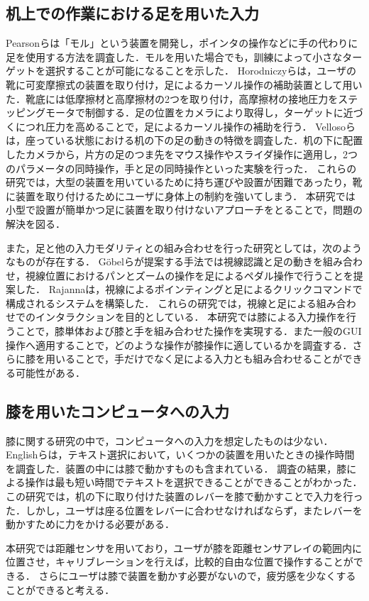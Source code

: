 \documentclass[submit, techrep]{ipsj}
\begin{document}
\subsection{机上での作業における足を用いた入力}
Pearsonら\cite{Pearson:1986:MMD:22627.22392, Pearson:1988:EEP:57167.57169}は「モル」という装置を開発し，ポインタの操作などに手の代わりに足を使用する方法を調査した．モルを用いた場合でも，訓練によって小さなターゲットを選択することが可能になることを示した．
Horodniczyら\cite{Horodniczy:2017:FHE:3025453.3025625}は，ユーザの靴に可変摩擦式の装置を取り付け，足によるカーソル操作の補助装置として用いた．靴底には低摩擦材と高摩擦材の2つを取り付け，高摩擦材の接地圧力をステッピングモータで制御する．足の位置をカメラにより取得し，ターゲットに近づくにつれ圧力を高めることで，足によるカーソル操作の補助を行う．
Vellosoら\cite{velloso:hal-01599657}は，座っている状態における机の下の足の動きの特徴を調査した．机の下に配置したカメラから，片方の足のつま先をマウス操作やスライダ操作に適用し，2つのパラメータの同時操作，手と足の同時操作といった実験を行った．
これらの研究では，大型の装置を用いているために持ち運びや設置が困難であったり，靴に装置を取り付けるためにユーザに身体上の制約を強いてしまう．
本研究では小型で設置が簡単かつ足に装置を取り付けないアプローチをとることで，問題の解決を図る．\par
また，足と他の入力モダリティとの組み合わせを行った研究としては，次のようなものが存在する．
G\"{o}belら\cite{Gobel:2013:GFI:2468356.2479610}が提案する手法では視線認識と足の動きを組み合わせ，視線位置におけるパンとズームの操作を足によるペダル操作で行うことを提案した．
Rajanna\cite{Rajanna:2016:GFI:2876456.2876462}は，視線によるポインティングと足によるクリックコマンドで構成されるシステムを構築した．
これらの研究では，視線と足による組み合わせでのインタラクションを目的としている．
本研究では膝による入力操作を行うことで，膝単体および膝と手を組み合わせた操作を実現する．また一般のGUI操作へ適用することで，どのような操作が膝操作に適しているかを調査する．さらに膝を用いることで，手だけでなく足による入力とも組み合わせることができる可能性がある．

\subsection{膝を用いたコンピュータへの入力}
膝に関する研究の中で，コンピュータへの入力を想定したものは少ない．
Englishら\cite{1698228}は，テキスト選択において，いくつかの装置を用いたときの操作時間を調査した．装置の中には膝で動かすものも含まれている．
調査の結果，膝による操作は最も短い時間でテキストを選択できることができることがわかった．
この研究では，机の下に取り付けた装置のレバーを膝で動かすことで入力を行った．しかし，ユーザは座る位置をレバーに合わせなければならず，またレバーを動かすために力をかける必要がある．\par
本研究では距離センサを用いており，ユーザが膝を距離センサアレイの範囲内に位置させ，キャリブレーションを行えば，比較的自由な位置で操作することができる．
さらにユーザは膝で装置を動かす必要がないので，疲労感を少なくすることができると考える．
\end{document}
